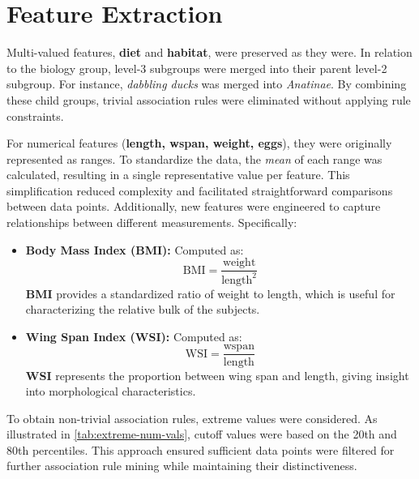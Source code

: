 \section{Feature Extraction}

Multi-valued features, \textbf{diet} and \textbf{habitat}, were preserved as
they were. In relation to the biology group, level-3 subgroups were merged
into their parent level-2 subgroup. For instance, \emph{dabbling ducks} was
merged into \emph{Anatinae}. By combining these child groups, trivial
association rules were eliminated without applying rule constraints.

For numerical features (\textbf{length, wspan, weight, eggs}), they were
originally represented as ranges. To standardize the data, the \emph{mean} of
each range was calculated, resulting in a single representative value per
feature. This simplification reduced complexity and facilitated straightforward
comparisons between data points. Additionally, new features were engineered to
capture relationships between different measurements. Specifically:

\begin{itemize}
    \item \textbf{Body Mass Index (BMI):} Computed as:
    \[
    \text{BMI} = \frac{\text{weight}}{\text{length}^2}
    \]
    \textbf{BMI} provides a standardized ratio of weight to length, which is
    useful for characterizing the relative bulk of the subjects.
    
    \item \textbf{Wing Span Index (WSI):} Computed as:
    \[
    \text{WSI} = \frac{\text{wspan}}{\text{length}}
    \]
    \textbf{WSI} represents the proportion between wing span and length,
    giving insight into morphological characteristics.
\end{itemize}

To obtain non-trivial association rules, extreme values were considered. As
illustrated in \autoref{tab:extreme-num-vals}, cutoff values were based on the
20th and 80th percentiles. This approach ensured sufficient data points were
filtered for further association rule mining while maintaining their
distinctiveness.

